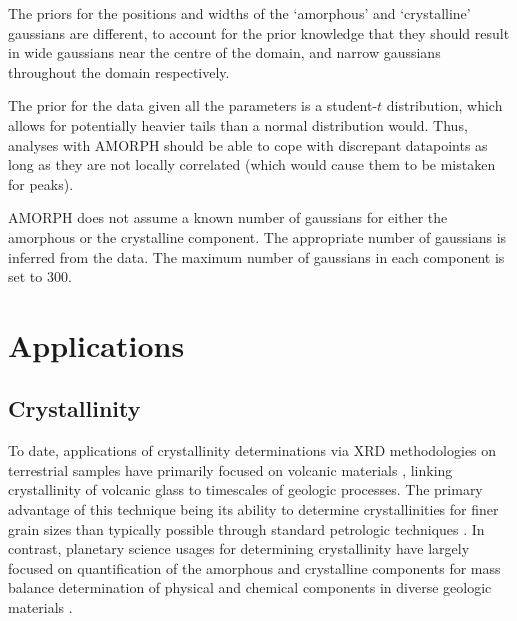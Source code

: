 \documentclass[review]{elsarticle}
\begin{document}
The priors for the positions and widths of the `amorphous' and `crystalline'
gaussians are different, to account for the prior knowledge that they
should result in wide gaussians near the centre of the domain, and
narrow gaussians throughout the domain respectively.

The prior for the data given all the parameters is a student-$t$ distribution,
which allows for potentially heavier tails than a normal distribution would.
Thus, analyses with AMORPH should be able to cope with discrepant datapoints
as long as they are not locally correlated (which would cause them to be
mistaken for peaks).

AMORPH does not assume a known number of gaussians for either the
amorphous or the crystalline component. The appropriate number of
gaussians is inferred from the data. The maximum number of gaussians
in each component is set to 300.

\section{Applications}\label{sec:applications}
\subsection{Crystallinity}
To date, applications of crystallinity determinations via XRD methodologies on terrestrial samples have primarily focused on volcanic materials \citep[e.g.,][]{wall2014, ellis2015, andrade2017, zorn2018}, linking crystallinity of volcanic glass to timescales of geologic processes. The primary advantage of this technique being its ability to determine crystallinities for finer grain sizes than typically possible through standard petrologic techniques \citep{rowe2012}. In contrast, planetary science usages for determining crystallinity have largely focused on quantification of the amorphous and crystalline components for mass balance determination of physical and chemical components in diverse geologic materials \citep[e.g.,][]{blake2013, dehouck2014}. 
\end{document}
